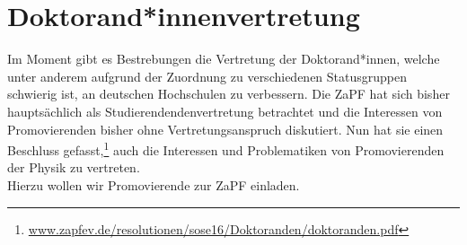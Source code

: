 \section*{Doktorand*innenvertretung}
Im Moment gibt es Bestrebungen die  Vertretung der Doktorand*innen, 
welche unter anderem aufgrund der Zuordnung zu verschiedenen Statusgruppen 
schwierig ist, an deutschen Hochschulen zu verbessern.  Die ZaPF hat sich 
bisher hauptsächlich als Studierendendenvertretung betrachtet und die 
Interessen von Promovierenden bisher ohne Vertretungsanspruch diskutiert. 
Nun hat sie einen Beschluss 
gefasst,\footnote{\href{http://www.zapfev.de/resolutionen/sose16/Doktoranden/doktoranden.pdf}{\url{www.zapfev.de/resolutionen/sose16/Doktoranden/doktoranden.pdf}}}
 auch die Interessen und Problematiken von Promovierenden der Physik zu 
vertreten.\\
Hierzu wollen wir Promovierende zur ZaPF einladen.



